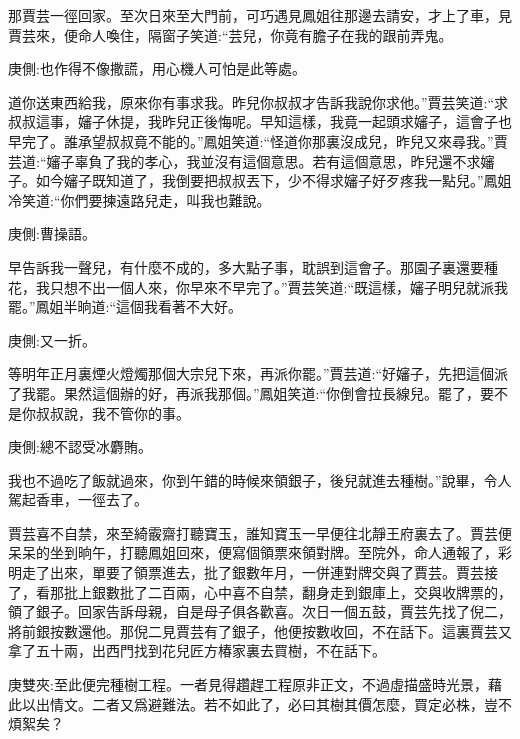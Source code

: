 \begin{parag}
    那賈芸一徑回家。至次日來至大門前，可巧遇見鳳姐往那邊去請安，才上了車，見賈芸來，便命人喚住，隔窗子笑道:“芸兒，你竟有膽子在我的跟前弄鬼。\begin{note}庚側:也作得不像撒謊，用心機人可怕是此等處。\end{note}道你送東西給我，原來你有事求我。昨兒你叔叔才告訴我說你求他。”賈芸笑道:“求叔叔這事，嬸子休提，我昨兒正後悔呢。早知這樣，我竟一起頭求嬸子，這會子也早完了。誰承望叔叔竟不能的。”鳳姐笑道:“怪道你那裏沒成兒，昨兒又來尋我。”賈芸道:“嬸子辜負了我的孝心，我並沒有這個意思。若有這個意思，昨兒還不求嬸子。如今嬸子既知道了，我倒要把叔叔丟下，少不得求嬸子好歹疼我一點兒。”鳳姐冷笑道:“你們要揀遠路兒走，叫我也難說。\begin{note}庚側:曹操語。\end{note}早告訴我一聲兒，有什麼不成的，多大點子事，耽誤到這會子。那園子裏還要種花，我只想不出一個人來，你早來不早完了。”賈芸笑道:“既這樣，嬸子明兒就派我罷。”鳳姐半晌道:“這個我看著不大好。\begin{note}庚側:又一折。\end{note}等明年正月裏煙火燈燭那個大宗兒下來，再派你罷。”賈芸道:“好嬸子，先把這個派了我罷。果然這個辦的好，再派我那個。”鳳姐笑道:“你倒會拉長線兒。罷了，要不是你叔叔說，我不管你的事。\begin{note}庚側:總不認受冰麝賄。\end{note}我也不過吃了飯就過來，你到午錯的時候來領銀子，後兒就進去種樹。”說畢，令人駕起香車，一徑去了。
\end{parag}


\begin{parag}
    賈芸喜不自禁，來至綺霰齋打聽寶玉，誰知寶玉一早便往北靜王府裏去了。賈芸便呆呆的坐到晌午，打聽鳳姐回來，便寫個領票來領對牌。至院外，命人通報了，彩明走了出來，單要了領票進去，批了銀數年月，一併連對牌交與了賈芸。賈芸接了，看那批上銀數批了二百兩，心中喜不自禁，翻身走到銀庫上，交與收牌票的，領了銀子。回家告訴母親，自是母子俱各歡喜。次日一個五鼓，賈芸先找了倪二，將前銀按數還他。那倪二見賈芸有了銀子，他便按數收回，不在話下。這裏賈芸又拿了五十兩，出西門找到花兒匠方椿家裏去買樹，不在話下。\begin{note}庚雙夾:至此便完種樹工程。一者見得趲趕工程原非正文，不過虛描盛時光景，藉此以出情文。二者又爲避難法。若不如此了，必曰其樹其價怎麼，買定必株，豈不煩絮矣？\end{note}
\end{parag}


